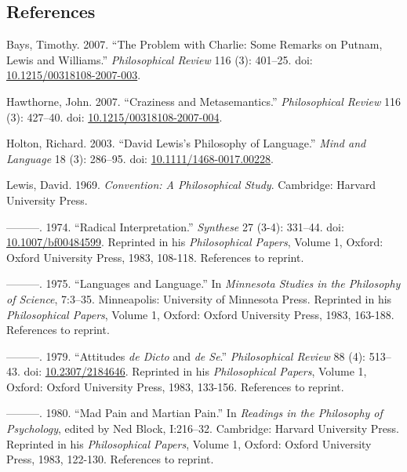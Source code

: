 \documentclass[
  10pt,
  letterpaper,
  DIV=11,
  numbers=noendperiod,
  twoside]{scrartcl}
\newlength{\cslhangindent}
\newenvironment{CSLReferences}[2] %
 {\begin{list}{}{%
  \setlength{\itemindent}{0pt}
  \setlength{\leftmargin}{0pt}
  \setlength{\parsep}{0pt}
  \ifodd #1
   \setlength{\leftmargin}{\cslhangindent}
   \setlength{\itemindent}{-1\cslhangindent}
  \fi
  \setlength{\itemsep}{#2\baselineskip}}}
 {\end{list}}
\begin{document}
\subsection*{References}\label{references}

\label{refs}
\begin{CSLReferences}{1}{0}
Bays, Timothy. 2007. {``The Problem with Charlie: Some Remarks on
Putnam, Lewis and Williams.''} \emph{Philosophical Review} 116 (3):
401--25. doi:
\href{https://doi.org/10.1215/00318108-2007-003}{10.1215/00318108-2007-003}.

Hawthorne, John. 2007. {``Craziness and Metasemantics.''}
\emph{Philosophical Review} 116 (3): 427--40. doi:
\href{https://doi.org/10.1215/00318108-2007-004}{10.1215/00318108-2007-004}.

Holton, Richard. 2003. {``David Lewis's Philosophy of Language.''}
\emph{Mind and Language} 18 (3): 286--95. doi:
\href{https://doi.org/10.1111/1468-0017.00228}{10.1111/1468-0017.00228}.

Lewis, David. 1969. \emph{Convention: A Philosophical Study}. Cambridge:
Harvard University Press.

---------. 1974. {``Radical Interpretation.''} \emph{Synthese} 27 (3-4):
331--44. doi:
\href{https://doi.org/10.1007/bf00484599}{10.1007/bf00484599}. Reprinted
in his \emph{Philosophical Papers}, Volume 1, Oxford: Oxford University
Press, 1983, 108-118. References to reprint.

---------. 1975. {``Languages and Language.''} In \emph{Minnesota
Studies in the Philosophy of Science}, 7:3--35. Minneapolis: University
of Minnesota Press. Reprinted in his \emph{Philosophical Papers}, Volume
1, Oxford: Oxford University Press, 1983, 163-188. References to
reprint.

---------. 1979. {``Attitudes \emph{de Dicto} and \emph{de Se}.''}
\emph{Philosophical Review} 88 (4): 513--43. doi:
\href{https://doi.org/10.2307/2184646}{10.2307/2184646}. Reprinted in
his \emph{Philosophical Papers}, Volume 1, Oxford: Oxford University
Press, 1983, 133-156. References to reprint.

---------. 1980. {``Mad Pain and Martian Pain.''} In \emph{Readings in
the Philosophy of Psychology}, edited by Ned Block, I:216--32.
Cambridge: Harvard University Press. Reprinted in his
\emph{Philosophical Papers}, Volume 1, Oxford: Oxford University Press,
1983, 122-130. References to reprint.


\end{CSLReferences}
\end{document}
